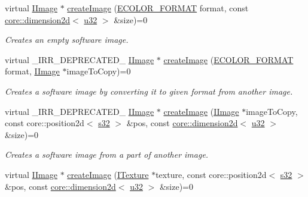 \begin{DoxyCompactItemize}
virtual \hyperlink{classirr_1_1video_1_1IImage}{I\+Image} $\ast$ \hyperlink{classirr_1_1video_1_1IVideoDriver_aee1578fdd92118665755f31c0dd1dbb5}{create\+Image} (\hyperlink{namespaceirr_1_1video_a1d5e487888c32b1674a8f75116d829ed}{E\+C\+O\+L\+O\+R\+\_\+\+F\+O\+R\+M\+AT} format, const \hyperlink{classirr_1_1core_1_1dimension2d}{core\+::dimension2d}$<$ \hyperlink{namespaceirr_a0416a53257075833e7002efd0a18e804}{u32} $>$ \&size)=0
\begin{DoxyCompactList}\small\item\em Creates an empty software image. \end{DoxyCompactList}\item 
virtual \+\_\+\+I\+R\+R\+\_\+\+D\+E\+P\+R\+E\+C\+A\+T\+E\+D\+\_\+ \hyperlink{classirr_1_1video_1_1IImage}{I\+Image} $\ast$ \hyperlink{classirr_1_1video_1_1IVideoDriver_af92ef735bc8c755f5c201a52a70d05e8}{create\+Image} (\hyperlink{namespaceirr_1_1video_a1d5e487888c32b1674a8f75116d829ed}{E\+C\+O\+L\+O\+R\+\_\+\+F\+O\+R\+M\+AT} format, \hyperlink{classirr_1_1video_1_1IImage}{I\+Image} $\ast$image\+To\+Copy)=0
\begin{DoxyCompactList}\small\item\em Creates a software image by converting it to given format from another image. \end{DoxyCompactList}\item 
virtual \+\_\+\+I\+R\+R\+\_\+\+D\+E\+P\+R\+E\+C\+A\+T\+E\+D\+\_\+ \hyperlink{classirr_1_1video_1_1IImage}{I\+Image} $\ast$ \hyperlink{classirr_1_1video_1_1IVideoDriver_aa06059abf33e473d7af77e1fbc2b0f75}{create\+Image} (\hyperlink{classirr_1_1video_1_1IImage}{I\+Image} $\ast$image\+To\+Copy, const core\+::position2d$<$ \hyperlink{namespaceirr_ac66849b7a6ed16e30ebede579f9b47c6}{s32} $>$ \&pos, const \hyperlink{classirr_1_1core_1_1dimension2d}{core\+::dimension2d}$<$ \hyperlink{namespaceirr_a0416a53257075833e7002efd0a18e804}{u32} $>$ \&size)=0
\begin{DoxyCompactList}\small\item\em Creates a software image from a part of another image. \end{DoxyCompactList}\item 
virtual \hyperlink{classirr_1_1video_1_1IImage}{I\+Image} $\ast$ \hyperlink{classirr_1_1video_1_1IVideoDriver_a38e722e8dd2d750907e9e059c3dc8fae}{create\+Image} (\hyperlink{classirr_1_1video_1_1ITexture}{I\+Texture} $\ast$texture, const core\+::position2d$<$ \hyperlink{namespaceirr_ac66849b7a6ed16e30ebede579f9b47c6}{s32} $>$ \&pos, const \hyperlink{classirr_1_1core_1_1dimension2d}{core\+::dimension2d}$<$ \hyperlink{namespaceirr_a0416a53257075833e7002efd0a18e804}{u32} $>$ \&size)=0

\end{DoxyCompactItemize}

